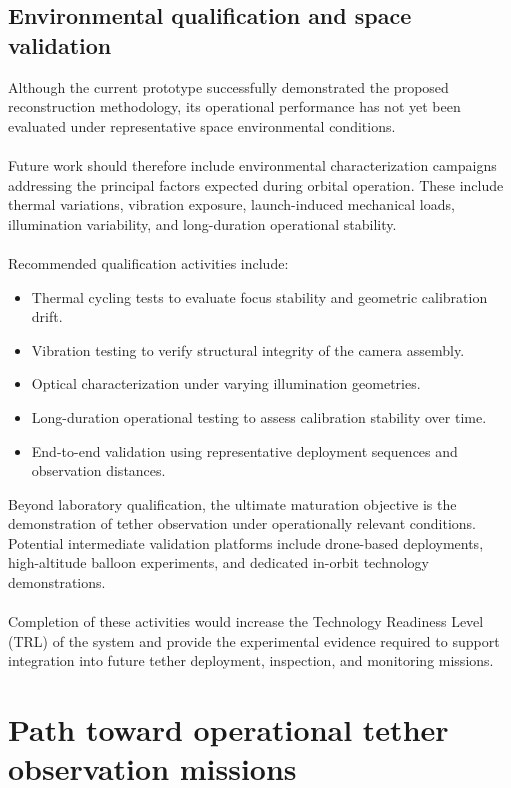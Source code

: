 \subsection{Environmental qualification and space validation}

Although the current prototype successfully demonstrated the proposed reconstruction methodology, its operational performance has not yet been evaluated under representative space environmental conditions.
\\\\
Future work should therefore include environmental characterization campaigns addressing the principal factors expected during orbital operation. These include thermal variations, vibration exposure, launch-induced mechanical loads, illumination variability, and long-duration operational stability.
\\\\
Recommended qualification activities include:

\begin{itemize}
    \item Thermal cycling tests to evaluate focus stability and geometric calibration drift.
    \item Vibration testing to verify structural integrity of the camera assembly.
    \item Optical characterization under varying illumination geometries.
    \item Long-duration operational testing to assess calibration stability over time.
    \item End-to-end validation using representative deployment sequences and observation distances.
\end{itemize}

Beyond laboratory qualification, the ultimate maturation objective is the demonstration of tether observation under operationally relevant conditions. Potential intermediate validation platforms include drone-based deployments, high-altitude balloon experiments, and dedicated in-orbit technology demonstrations.
\\\\
Completion of these activities would increase the Technology Readiness Level (TRL) of the system and provide the experimental evidence required to support integration into future tether deployment, inspection, and monitoring missions.

\section{Path toward operational tether observation missions}


